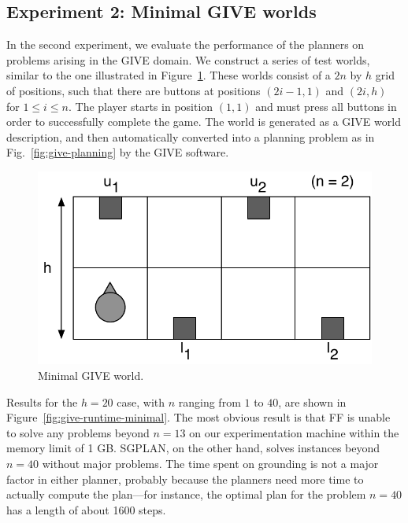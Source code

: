 \subsection{Experiment 2: Minimal GIVE worlds}
\label{sec:exper-2:-minim}

In the second experiment, we evaluate the performance of the planners
on problems arising in the GIVE domain. We construct a series of test
worlds, similar to the one illustrated in
Figure~\ref{fig:give-minimal}. These worlds consist of a $2n$ by $h$
grid of positions, such that there are buttons at positions $(2i-1,1)$
and $(2i,h)$ for $1 \leq i \leq n$. The player starts in position
$(1,1)$ and must press all buttons in order to successfully complete
the game. The world is generated as a GIVE world description, and then
automatically converted into a planning problem as in
Fig.~\ref{fig:give-planning} by the GIVE software.

\begin{figure}
  \centering
  \includegraphics[width=0.8\columnwidth]{pic-buttons}
  \caption{Minimal GIVE world.}
  \label{fig:give-minimal}
\end{figure}

Results for the $h=20$ case, with $n$ ranging from $1$ to $40$, are shown
in Figure~\ref{fig:give-runtime-minimal}.  The most obvious result is that
FF is unable to solve any problems beyond $n=13$ on our experimentation
machine within the memory limit of 1 GB.  SGPLAN, on the other hand, solves
instances beyond $n=40$ without major problems.  The time spent on
grounding is not a major factor in either planner, probably because the
planners need more time to actually compute the plan---for instance, the
optimal plan for the problem $n=40$ has a length of about 1600 steps.

